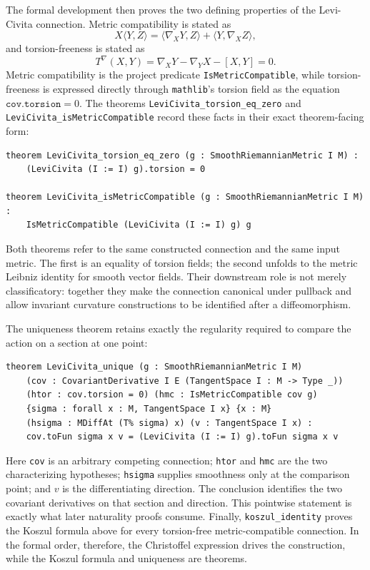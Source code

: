 \documentclass[11pt]{article}
\theoremstyle{plain}
\theoremstyle{definition}
\theoremstyle{remark}
\newcommand{\leanref}[1]{\nolinkurl{#1}}
\begin{document}
The formal development then proves the two defining properties of the
Levi-Civita connection.  Metric compatibility is stated as
\[
  X\langle Y,Z\rangle
  =
  \langle \nabla_XY,Z\rangle
  +
  \langle Y,\nabla_XZ\rangle,
\]
and torsion-freeness is stated as
\[
  T^\nabla(X,Y)
  =
  \nabla_XY-\nabla_YX-[X,Y]
  =
  0.
\]
Metric compatibility is the project predicate \leanref{IsMetricCompatible},
while torsion-freeness is expressed directly through \texttt{mathlib}'s
torsion field as the equation \(\texttt{cov.torsion}=0\).  The theorems
\leanref{LeviCivita_torsion_eq_zero} and
\leanref{LeviCivita_isMetricCompatible} record these facts in their exact
theorem-facing form:

\begin{Verbatim}[breaklines=true,breakanywhere=true,fontsize=\small]
theorem LeviCivita_torsion_eq_zero (g : SmoothRiemannianMetric I M) :
    (LeviCivita (I := I) g).torsion = 0

theorem LeviCivita_isMetricCompatible (g : SmoothRiemannianMetric I M) :
    IsMetricCompatible (LeviCivita (I := I) g) g
\end{Verbatim}

Both theorems refer to the same constructed connection and the same input
metric.  The first is an equality of torsion fields; the second unfolds to the
metric Leibniz identity for smooth vector fields.  Their downstream role is
not merely classificatory: together they make the connection canonical under
pullback and allow invariant curvature constructions to be identified after a
diffeomorphism.

The uniqueness theorem retains exactly the regularity required to compare the
action on a section at one point:

\begin{Verbatim}[breaklines=true,breakanywhere=true,fontsize=\small]
theorem LeviCivita_unique (g : SmoothRiemannianMetric I M)
    (cov : CovariantDerivative I E (TangentSpace I : M -> Type _))
    (htor : cov.torsion = 0) (hmc : IsMetricCompatible cov g)
    {sigma : forall x : M, TangentSpace I x} {x : M}
    (hsigma : MDiffAt (T% sigma) x) (v : TangentSpace I x) :
    cov.toFun sigma x v = (LeviCivita (I := I) g).toFun sigma x v
\end{Verbatim}

Here \texttt{cov} is an arbitrary competing connection; \texttt{htor} and
\texttt{hmc} are the two characterizing hypotheses; \texttt{hsigma} supplies
smoothness only at the comparison point; and $v$ is the differentiating
direction.  The conclusion identifies the two covariant derivatives on that
section and direction.  This pointwise statement is exactly what later
naturality proofs consume.  Finally, \leanref{koszul_identity} proves the
Koszul formula above for every torsion-free metric-compatible connection.  In
the formal order, therefore, the Christoffel expression drives the
construction, while the Koszul formula and uniqueness are theorems.
\end{document}
